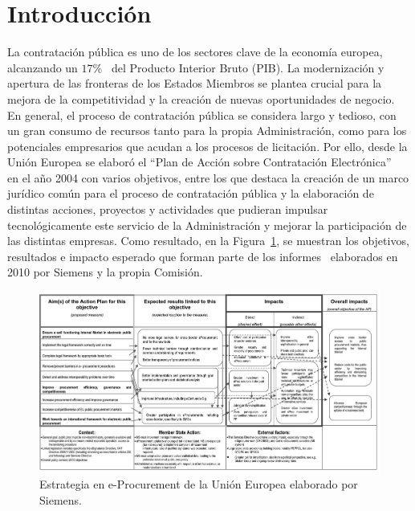 \section{Introducción}
La contratación pública es uno de los sectores clave de la economía europea, alcanzando
un $17$\%~\cite{europeanStrategy} del Producto Interior Bruto (\gls{PIB}). La modernización y apertura de las fronteras de los \gls{Estados} Miembros se plantea
crucial para la mejora de la competitividad y la creación de nuevas oportunidades de negocio. En general,
el proceso de contratación pública se considera largo y tedioso, con un gran consumo de recursos
tanto para la propia Administración, como para los potenciales empresarios que acudan a los procesos
de licitación. Por ello, desde la Unión \gls{Europea} se elaboró el ``Plan de Acción sobre Contratación Electrónica''~\cite{plan2004} en el año 2004 con
varios objetivos, entre los que destaca la creación de un marco jurídico común para el proceso
de contratación pública y la elaboración de distintas acciones, proyectos y actividades que
pudieran impulsar tecnológicamente este servicio de la Administración y mejorar la participación
de las distintas empresas. Como resultado, en la Figura~\ref{fig:ted-2}, se muestran los objetivos, resultados e impacto
esperado que forman parte de los informes~\cite{siemensEval,euEval} elaborados en 2010 por Siemens y la propia Comisión.

\begin{figure}[!htb]
\centering
	\includegraphics[width=16cm]{images/phd/eproc/ted-2}
\caption{Estrategia en e-Procurement de la Unión Europea elaborado por Siemens.}
\label{fig:ted-2}
\end{figure}

